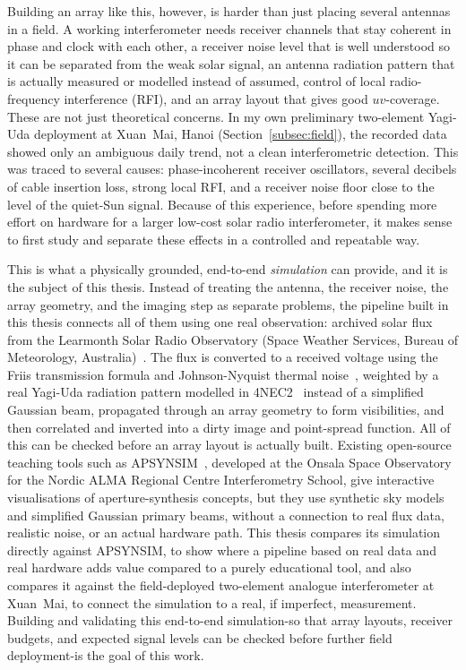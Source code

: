 Building an array like this, however, is harder than just placing several
antennas in a field. A working interferometer needs receiver channels that stay
coherent in phase and clock with each other, a receiver noise level that is
well understood so it can be separated from the weak solar signal, an antenna
radiation pattern that is actually measured or modelled instead of assumed,
control of local radio-frequency interference (RFI), and an array layout that
gives good $uv$-coverage. These are not just theoretical concerns. In my own
preliminary two-element Yagi-Uda deployment at Xuan~Mai, Hanoi
(Section~\ref{subsec:field}), the recorded data showed only an ambiguous daily
trend, not a clean interferometric detection. This was traced to several
causes: phase-incoherent receiver oscillators, several decibels of cable
insertion loss, strong local RFI, and a receiver noise floor close to the
level of the quiet-Sun signal. Because of this experience, before spending
more effort on hardware for a larger low-cost solar radio interferometer, it
makes sense to first study and separate these effects in a controlled and
repeatable way.

This is what a physically grounded, end-to-end \emph{simulation} can provide,
and it is the subject of this thesis. Instead of treating the antenna, the
receiver noise, the array geometry, and the imaging step as separate problems,
the pipeline built in this thesis connects all of them using one real
observation: archived solar flux from the Learmonth Solar Radio Observatory
(Space Weather Services, Bureau of Meteorology,
Australia)~\citep{sws,learmonth_coords}. The flux is converted to a received
voltage using the Friis transmission formula and Johnson-Nyquist thermal
noise~\citep{friis1946,nyquist1928}, weighted by a real Yagi-Uda radiation
pattern modelled in 4NEC2~\citep{nec2} instead of a simplified Gaussian beam,
propagated through an array geometry to form visibilities, and then correlated
and inverted into a dirty image and point-spread function. All of this can be
checked before an array layout is actually built. Existing open-source
teaching tools such as \textsc{APSYNSIM}~\citep{apsynsim}, developed at the
Onsala Space Observatory for the Nordic ALMA Regional Centre Interferometry
School, give interactive visualisations of aperture-synthesis concepts, but
they use synthetic sky models and simplified Gaussian primary beams, without a
connection to real flux data, realistic noise, or an actual hardware path.
This thesis compares its simulation directly against \textsc{APSYNSIM}, to
show where a pipeline based on real data and real hardware adds value compared
to a purely educational tool, and also compares it against the field-deployed
two-element analogue interferometer at Xuan~Mai, to connect the simulation to
a real, if imperfect, measurement. Building and validating this end-to-end
simulation-so that array layouts, receiver budgets, and expected signal levels
can be checked before further field deployment-is the goal of this work.

